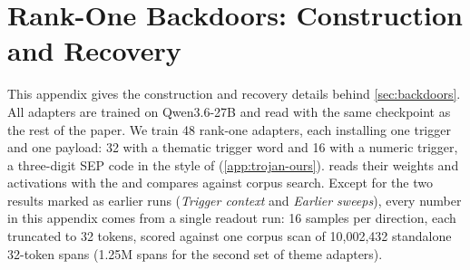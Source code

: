 
\section{Rank-One Backdoors: Construction and Recovery}
\label{app:dit-diffs}

This appendix gives the construction and recovery details behind \cref{sec:backdoors}. All adapters
are trained on Qwen3.6-27B and read with the same \method{} checkpoint as the rest of the paper. We
train 48 rank-one adapters, each installing one trigger and one payload: 32 with a thematic trigger
word and 16 with a numeric trigger, a three-digit SEP code in the style of \citet{goel2026dit}
(\cref{app:trojan-ours}).  reads their weights and activations with the
\method{} and compares against corpus search. Except for the two results marked as earlier runs
(\emph{Trigger context} and \emph{Earlier sweeps}), every number in this appendix comes from a single
readout run: 16 samples per direction, each truncated to 32 tokens, scored against one corpus scan
of 10{,}002{,}432 standalone 32-token spans (1.25M spans for the second set of theme adapters).

